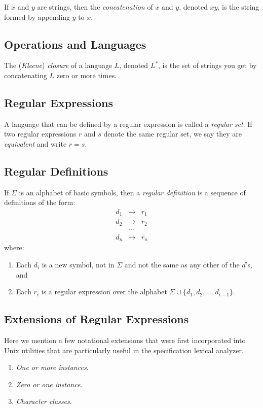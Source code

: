 \documentclass[12pt,a4paper,twoside,openany]{book}
\begin{document}
If $x$ and $y$ are strings, then the \textit{concatenation} of $x$ and $y$, denoted $xy$, is the string formed by appending $y$ to $x$.

\subsection{Operations and Languages}

The (\textit{Kleene}) \textit{closure} of a language $L$, denoted $L^*$, is the set of strings you get by concatenating $L$ zero or more times.

\subsection{Regular Expressions}

A language that can be defined by a regular expression is called a \textit{regular set}. If two regular expressions $r$ and $s$ denote the same regular set, we say they are \textit{equivalent} and write $r=s$.

\subsection{Regular Definitions}

If $\Sigma$ is an alphabet of basic symbols, then a \textit{regular definition} is a sequence of definitions of the form: $$\begin{array}{ccc}d_1&\to&r_1\\d_2&\to&r_2\\&\cdots\\d_n&\to&r_n\end{array}$$ where:
\begin{enumerate}
    \item Each $d_i$ is a new symbol, not in $\Sigma$ and not the same as any other of the $d$'s, and
    \item Each $r_i$ is a regular expression over the alphabet $\Sigma\cup\{d_1,d_2,\ldots,d_{i-1}\}$.
\end{enumerate}

\subsection{Extensions of Regular Expressions}

Here we mention a few notational extensions that were first incorporated into Unix utilities that are particularly useful in the specification lexical analyzer.
\begin{enumerate}
    \item\textit{One or more instances}.
    \item\textit{Zero or one instance}.
    \item\textit{Character classes}.
\end{enumerate}
\end{document}
